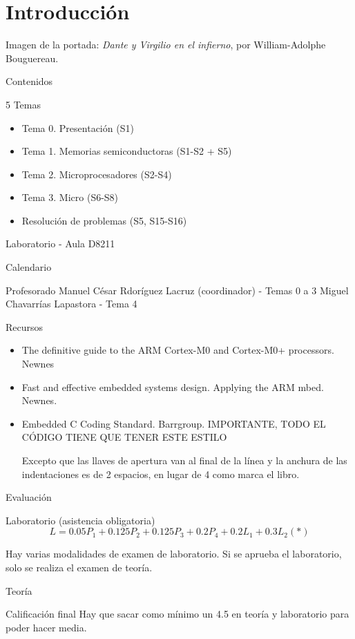 \documentclass[a4paper]{book}
\begin{document}
\newpage
{}
{}
\section*{Introducción}
Imagen de la portada: \textsl{Dante y Virgilio en el infierno}, por William-Adolphe Bouguereau.

Contenidos

5 Temas

\begin{itemize}
	\item Tema 0. Presentación (S1)
	\item Tema 1. Memorias semiconductoras (S1-S2 + S5)
	\item Tema 2. Microprocesadores (S2-S4)
	\item Tema 3. Micro (S6-S8)
	\item Resolución de problemas (S5, S15-S16)
\end{itemize}

Laboratorio - Aula D8211

Calendario

Profesorado
Manuel César Rdoríguez Lacruz (coordinador) - Temas 0 a 3
Miguel Chavarrías Lapastora - Tema 4

Recursos
\begin{itemize}
	\item The definitive guide to the ARM Cortex-M0 and Cortex-M0+ processors. Newnes
	\item Fast and effective embedded systems design. Applying the ARM mbed. Newnes.
	\item Embedded C Coding Standard. Barrgroup. IMPORTANTE, TODO EL CÓDIGO TIENE QUE TENER ESTE ESTILO

	      Excepto que las llaves de apertura van al final de la línea y la anchura de las indentaciones es de 2 espacios, en lugar de 4 como marca el libro.
\end{itemize}

Evaluación

Laboratorio (asistencia obligatoria)
\[ L = 0.05P_1 + 0.125P_2 + 0.125P_3 +0.2P_4 + 0.2L_1 + 0.3L_2 (*)\]

Hay varias modalidades de examen de laboratorio. Si se aprueba el laboratorio, solo se realiza el examen de teoría.

Teoría

Calificación final
Hay que sacar como mínimo un 4.5 en teoría y laboratorio para poder hacer media.
\end{document}
